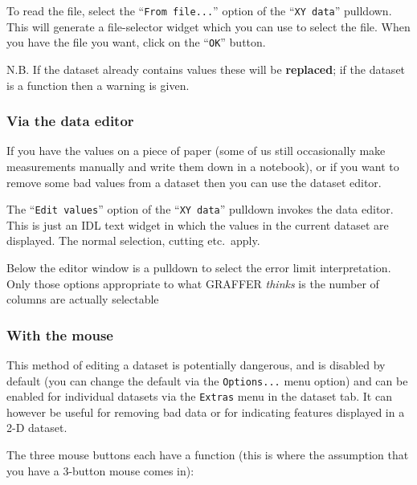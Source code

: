 \documentclass[11pt,twoside,english]{article}
\begin{document}
To read the file, select the {}``\texttt{From file...}'' option of the
{}``\texttt{XY data}'' pulldown. This will generate a file-selector
widget which you can use to select the file. When you have the file you
want, click on the {}``\texttt{OK}'' button.

N.B. If the dataset already contains values these will be
\textbf{replaced}; if the dataset is a function then a warning is
given.


\subsubsection{Via the data editor }

If you have the values on a piece of paper (some of us still
occasionally make measurements manually and write them down in a
notebook), or if you want to remove some bad values from a dataset then
you can use the dataset editor.

The {}``\texttt{Edit values}'' option of the {}``\texttt{XY data}''
pulldown invokes the data editor. This is just an IDL text widget in
which the values in the current dataset are displayed. The normal
selection, cutting etc.\ apply.

Below the editor window is a pulldown to select the error limit
interpretation.  Only those options appropriate to what GRAFFER
\textit{thinks} is the number of columns are actually selectable


\subsubsection{With the mouse}

This method of editing a dataset is potentially dangerous, and is
disabled by default (you can change the default via the
\texttt{Options...} menu option) and can be enabled for individual
datasets via the \texttt{Extras} menu in the dataset tab.  It can
however be useful for removing bad data or for indicating features
displayed in a 2-D dataset.  

The three mouse buttons each have a function (this is where the
assumption that you have a 3-button mouse comes in):
\end{document}
